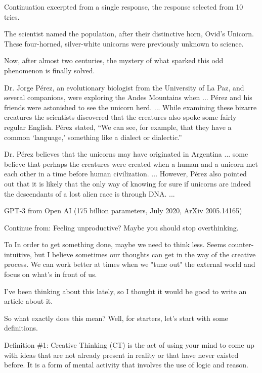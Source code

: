 {

{\color{red} Continuation excerpted from a single response, the response selected from 10 tries.}

\bigskip

The scientist named the population, after their distinctive horn, Ovid’s Unicorn. These four-horned, silver-white unicorns were previously unknown to science.

Now, after almost two centuries, the mystery of what sparked this odd phenomenon is finally solved.

Dr. Jorge Pérez, an evolutionary biologist from the University of La Paz, and several companions, were exploring the Andes Mountains when ...
Pérez and his friends were astonished to see the unicorn herd. ...
While examining these bizarre creatures the scientists discovered that the creatures also spoke some fairly regular English. Pérez stated, “We can see, for example, that they have a common ‘language,’ something like a dialect or dialectic.”

Dr. Pérez believes that the unicorns may have originated in Argentina ... some believe that perhaps the creatures were created when a human and a unicorn met each other in a time before human civilization. ... However, Pérez also pointed out that it is likely that the only way of knowing for sure if unicorns are indeed the descendants of a lost alien race is through DNA. ...



GPT-3 from Open AI (175 billion parameters, July 2020, ArXiv 2005.14165)

\vfill
{\color{red} Continue from: Feeling unproductive? Maybe you should stop overthinking.}

\vfill
To In order to get something done, maybe we need to think less. Seems counter-intuitive, but I believe sometimes our thoughts can get in the way of the creative process. We can work better at times when we "tune out" the external world and focus on what's in front of us.

\vfill
I've been thinking about this lately, so I thought it would be good to write an article about it. 

\vfill
So what exactly does this mean? Well, for starters, let's start with some definitions.

\vfill
Definition \#1: Creative Thinking (CT) is the act of using your mind to come up with ideas that are not already present in reality or that have never existed before. It is a form of mental activity that involves the use of logic and reason.

}
